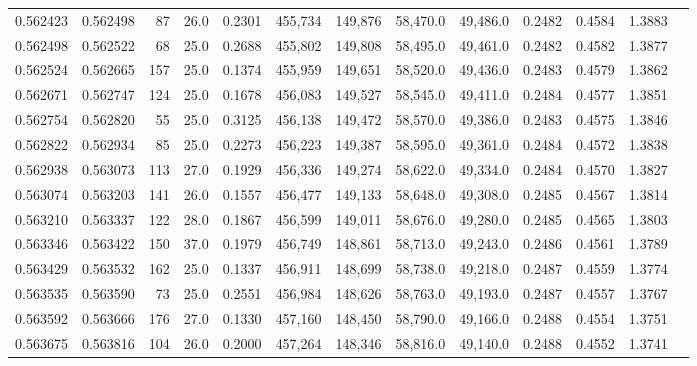 \begin{tabular}{rrrrrrrrrrrrr}
0.562423 & 0.562498 &    87 & 26.0 &                                     0.2301 & 455,734 & 149,876 &  58,470.0 &  49,486.0 & 0.2482 & 0.4584 & 1.3883 \\
0.562498 & 0.562522 &    68 & 25.0 &                                     0.2688 & 455,802 & 149,808 &  58,495.0 &  49,461.0 & 0.2482 & 0.4582 & 1.3877 \\
0.562524 & 0.562665 &   157 & 25.0 &                                     0.1374 & 455,959 & 149,651 &  58,520.0 &  49,436.0 & 0.2483 & 0.4579 & 1.3862 \\
0.562671 & 0.562747 &   124 & 25.0 &                                     0.1678 & 456,083 & 149,527 &  58,545.0 &  49,411.0 & 0.2484 & 0.4577 & 1.3851 \\
0.562754 & 0.562820 &    55 & 25.0 &                                     0.3125 & 456,138 & 149,472 &  58,570.0 &  49,386.0 & 0.2483 & 0.4575 & 1.3846 \\
0.562822 & 0.562934 &    85 & 25.0 &                                     0.2273 & 456,223 & 149,387 &  58,595.0 &  49,361.0 & 0.2484 & 0.4572 & 1.3838 \\
0.562938 & 0.563073 &   113 & 27.0 &                                     0.1929 & 456,336 & 149,274 &  58,622.0 &  49,334.0 & 0.2484 & 0.4570 & 1.3827 \\
0.563074 & 0.563203 &   141 & 26.0 &                                     0.1557 & 456,477 & 149,133 &  58,648.0 &  49,308.0 & 0.2485 & 0.4567 & 1.3814 \\
0.563210 & 0.563337 &   122 & 28.0 &                                     0.1867 & 456,599 & 149,011 &  58,676.0 &  49,280.0 & 0.2485 & 0.4565 & 1.3803 \\
0.563346 & 0.563422 &   150 & 37.0 &                                     0.1979 & 456,749 & 148,861 &  58,713.0 &  49,243.0 & 0.2486 & 0.4561 & 1.3789 \\
0.563429 & 0.563532 &   162 & 25.0 &                                     0.1337 & 456,911 & 148,699 &  58,738.0 &  49,218.0 & 0.2487 & 0.4559 & 1.3774 \\
0.563535 & 0.563590 &    73 & 25.0 &                                     0.2551 & 456,984 & 148,626 &  58,763.0 &  49,193.0 & 0.2487 & 0.4557 & 1.3767 \\
0.563592 & 0.563666 &   176 & 27.0 &                                     0.1330 & 457,160 & 148,450 &  58,790.0 &  49,166.0 & 0.2488 & 0.4554 & 1.3751 \\
0.563675 & 0.563816 &   104 & 26.0 &                                     0.2000 & 457,264 & 148,346 &  58,816.0 &  49,140.0 & 0.2488 & 0.4552 & 1.3741 \\

\end{tabular}
